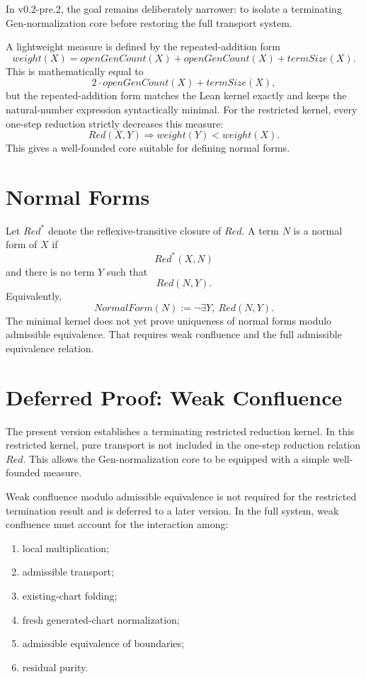 \documentclass[11pt]{article}
\begin{document}
In v0.2-pre.2, the goal remains deliberately narrower: to isolate a terminating Gen-normalization core before restoring the full transport system.

A lightweight measure is defined by the repeated-addition form
\[
weight(X)=openGenCount(X)+openGenCount(X)+termSize(X).
\]
This is mathematically equal to
\[
2\cdot openGenCount(X)+termSize(X),
\]
but the repeated-addition form matches the Lean kernel exactly and keeps the natural-number expression syntactically minimal. For the restricted kernel, every one-step reduction strictly decreases this measure:
\[
Red(X,Y)\Rightarrow weight(Y)<weight(X).
\]
This gives a well-founded core suitable for defining normal forms.

\section{Normal Forms}

Let $Red^*$ denote the reflexive-transitive closure of $Red$. A term $N$ is a normal form of $X$ if
\[
Red^*(X,N)
\]
and there is no term $Y$ such that
\[
Red(N,Y).
\]
Equivalently,
\[
NormalForm(N):=\neg\exists Y,\ Red(N,Y).
\]
The minimal kernel does not yet prove uniqueness of normal forms modulo admissible equivalence. That requires weak confluence and the full admissible equivalence relation.

\section{Deferred Proof: Weak Confluence}

The present version establishes a terminating restricted reduction kernel. In this restricted kernel, pure transport is not included in the one-step reduction relation $Red$. This allows the Gen-normalization core to be equipped with a simple well-founded measure.

Weak confluence modulo admissible equivalence is not required for the restricted termination result and is deferred to a later version. In the full system, weak confluence must account for the interaction among:
\begin{enumerate}
  \item local multiplication;
  \item admissible transport;
  \item existing-chart folding;
  \item fresh generated-chart normalization;
  \item admissible equivalence of boundaries;
  \item residual purity.
\end{enumerate}
\end{document}
